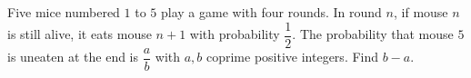 Five mice numbered $1$ to $5$ play a game with four rounds. In round $n$, if mouse $n$ is still alive, it eats mouse $n+1$ with probability $\dfrac12$. The probability that mouse $5$ is uneaten at the end is $\dfrac ab$ with $a,b$ coprime positive integers. Find $b-a$.
